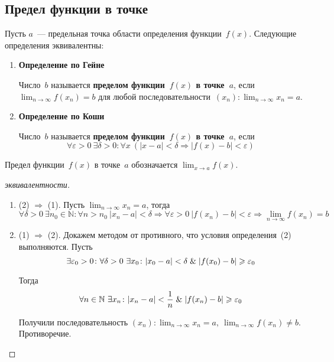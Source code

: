 \subsection{Предел функции в точке}
Пусть $a$~--- предельная точка области определения функции~$f(x)$.
Следующие определения эквивалентны:
\begin{enumerate}
	\item \textbf{Определение по Гейне}
	
	Число~$b$ называется \textbf{пределом функции~$f(x)$ в точке~$a$}, если $\displaystyle \lim_{n \to \infty} f(x_n) = b$ для любой последовательности~$\displaystyle (x_n): \lim_{n \to \infty} x_n = a$.
	
	\item \textbf{Определение по Коши}
	
	Число~$b$ называется \textbf{пределом функции~$f(x)$ в точке~$a$}, если
	\begin{equation*}
	\forall \varepsilon > 0 \ \exists \delta > 0 \colon \forall x \ (|x - a| < \delta \Rightarrow |f(x) - b| < \varepsilon)
	\end{equation*}
\end{enumerate}

Предел функции~$f(x)$ в точке~$a$ обозначается $\displaystyle \lim_{x \to a} f(x)$.
\begin{proof}[эквивалентности]
\begin{enumerate}
	\item (2) $\Rightarrow$ (1).
	Пусть $\displaystyle \lim_{n \to \infty} x_n = a$, тогда
	\begin{equation*}
	\forall \delta > 0 \ \exists n_0 \in \mathbb N \colon \forall n > n_0 \ |x_n - a| < \delta \Rightarrow
	\forall \varepsilon > 0 \ |f(x_n) - b| < \varepsilon \Rightarrow
	\lim_{n \to \infty} f(x_n) = b
	\end{equation*}
	
	\item (1) $\Rightarrow$ (2).
	Докажем методом от противного, что условия определения~(2) выполняются.
	Пусть
	\begin{equation*}
	\exists \varepsilon_0 > 0 \colon \forall \delta > 0 \ \exists x_0 \colon |x_0 - a| < \delta \mathrel{\&} |f(x_0) - b| \geqslant \varepsilon_0
	\end{equation*}
	
	Тогда
	\begin{equation*}
	\forall n \in \mathbb N \ \exists x_n \colon |x_n - a| < \frac1n \mathrel{\&} |f(x_n) - b| \geqslant \varepsilon_0
	\end{equation*}
	
	Получили последовательность $\displaystyle (x_n) \colon \lim_{n \to \infty} x_n = a, \ \lim_{n \to \infty} f(x_n) \neq b$.
	Противоречие.
\end{enumerate}
\end{proof}

